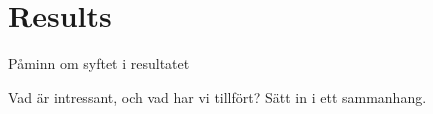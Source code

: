 \chapter{Results}

Påminn om syftet i resultatet

Vad är intressant, och vad har vi tillfört? Sätt in i ett sammanhang.